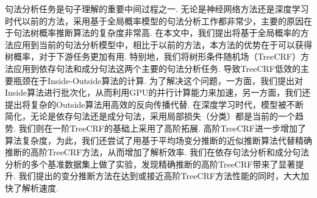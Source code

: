 
\begin{cabstract}
  句法分析任务是句子理解的重要中间过程之一.
  无论是神经网络方法还是深度学习时代以前的方法，采用基于全局概率模型的句法分析工作都非常少，主要的原因在于句法树概率推断算法的复杂度非常高.
  在本文中，我们提出将基于全局概率的方法应用到当前的句法分析模型中，相比于以前的方法，本方法的优势在于可以获得树概率，对于下游任务更加有用.
  特别地，我们将树形条件随机场（TreeCRF）方法应用到依存句法和成分句法这两个主要的句法分析任务.
  导致TreeCRF低效的主要瓶颈在于Inside-Outside算法的计算.
  为了解决这个问题，一方面，我们提出对Inside算法进行批次化，从而利用GPU的并行计算能力来加速，另一方面，我们还提出将复杂的Outside算法用高效的反向传播代替.
  在深度学习时代，模型被不断简化，无论是依存句法还是成分句法，采用局部损失（分类）都是当前的一个趋势.
  我们则在一阶TreeCRF的基础上采用了高阶拓展.
  高阶TreeCRF进一步增加了算法复杂度，为此，我们还尝试了用基于平均场变分推断的近似推断算法代替精确推断的高阶TreeCRF方法，从而增加了解析效率.
  我们在依存句法分析和成分句法分析的多个基准数据集上做了实验，发现精确推断的高阶TreeCRF带来了显著提升.
  我们提出的变分推断方法在达到或接近高阶TreeCRF方法性能的同时，大大加快了解析速度.


\end{cabstract}
